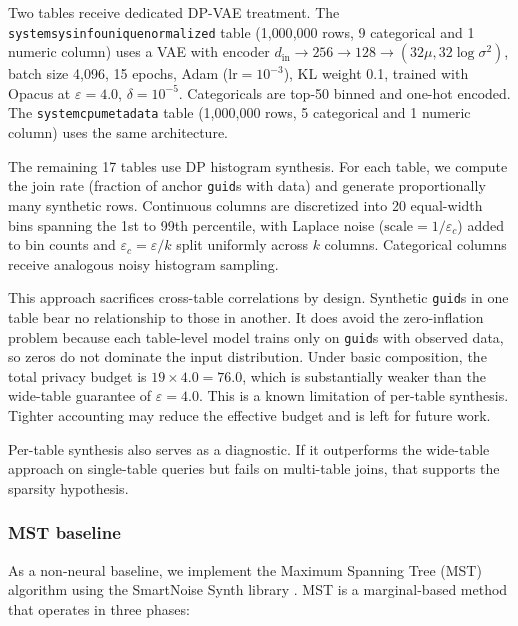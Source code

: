 \documentclass[12pt,letterpaper]{article}
\renewcommand{\_}{\textunderscore\allowbreak}
\begin{document}
Two tables receive dedicated DP-VAE treatment. The \texttt{system\_sysinfo\_unique\_normalized} table (1{,}000{,}000 rows, 9 categorical and 1 numeric column) uses a VAE with encoder $d_{\text{in}} \to 256 \to 128 \to (32\mu, 32\log\sigma^2)$, batch size 4{,}096, 15 epochs, Adam ($\text{lr} = 10^{-3}$), KL weight 0.1, trained with Opacus at $\varepsilon = 4.0$, $\delta = 10^{-5}$. Categoricals are top-50 binned and one-hot encoded. The \texttt{system\_cpu\_metadata} table (1{,}000{,}000 rows, 5 categorical and 1 numeric column) uses the same architecture.

The remaining 17 tables use DP histogram synthesis. For each table, we compute the join rate (fraction of anchor \texttt{guid}s with data) and generate proportionally many synthetic rows. Continuous columns are discretized into 20 equal-width bins spanning the 1st to 99th percentile, with Laplace noise ($\text{scale} = 1/\varepsilon_c$) added to bin counts and $\varepsilon_c = \varepsilon / k$ split uniformly across $k$ columns. Categorical columns receive analogous noisy histogram sampling.

This approach sacrifices cross-table correlations by design. Synthetic \texttt{guid}s in one table bear no relationship to those in another. It does avoid the zero-inflation problem because each table-level model trains only on \texttt{guid}s with observed data, so zeros do not dominate the input distribution. Under basic composition, the total privacy budget is $19 \times 4.0 = 76.0$, which is substantially weaker than the wide-table guarantee of $\varepsilon = 4.0$. This is a known limitation of per-table synthesis. Tighter accounting may reduce the effective budget and is left for future work.

Per-table synthesis also serves as a diagnostic. If it outperforms the wide-table approach on single-table queries but fails on multi-table joins, that supports the sparsity hypothesis.

\subsubsection{MST baseline}
\label{sec:methods-mst}

As a non-neural baseline, we implement the Maximum Spanning Tree (MST) algorithm \citep{mckenna2021winning} using the SmartNoise Synth library \citep{smartnoise2024}. MST is a marginal-based method that operates in three phases:
\end{document}
